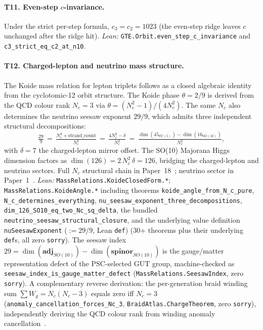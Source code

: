 \documentclass[12pt]{article}
\numberwithin{equation}{section}
\begin{document}
\paragraph{T11. Even-step $c$-invariance.}
Under the strict per-step formula, $c_3 = c_2 = 1023$ (the even-step ridge leaves $c$ unchanged after the ridge hit).
\textit{Lean:} \texttt{GTE.Orbit.even\_step\_c\_invariance} and \texttt{c3\_strict\_eq\_c2\_at\_n10}.

\paragraph{T12. Charged-lepton and neutrino mass structure.}
The Koide mass relation for lepton triplets follows as a closed algebraic identity from the cyclotomic-12 orbit structure.  The Koide phase $\theta = 2/9$ is derived from the QCD colour rank $N_c = 3$ via $\theta = (N_c^2-1)/(4N_c^2)$.  The same $N_c$ also determines the neutrino seesaw exponent $29/9$, which admits three independent structural decompositions:
\[
\tfrac{29}{9} \,=\, \tfrac{N_c^3 + \mathrm{strand\_count}}{N_c^2} \,=\, \tfrac{4N_c^2 - \delta}{N_c^2} \,=\, \tfrac{\dim(45_{\mathrm{SU}(5)}) - \dim(16_{\mathrm{SO}(10)})}{N_c^2},
\]
with $\delta = 7$ the charged-lepton mirror offset.  The SO(10) Majorana Higgs dimension factors as $\dim(126) = 2\,N_c^2\,\delta = 126$, bridging the charged-lepton and neutrino sectors.  Full $N_c$ structural chain in Paper~18~\cite{Spivack2026_Koide}; neutrino sector in Paper~1~\cite{Spivack2025_ParticlePhysics}.
\textit{Lean:} \texttt{MassRelations.KoideClosedForm.*}; \texttt{MassRelations.KoideAngle.*} including theorems \texttt{koide\_angle\_from\_N\_c\_pure}, \texttt{N\_c\_determines\_everything}, \texttt{nu\_seesaw\_exponent\_three\_decompositions}, \texttt{dim\_126\_SO10\_eq\_two\_Nc\_sq\_delta}, the bundled \texttt{neutrino\_seesaw\_structural\_closure}, and the underlying value definition \texttt{nuSeesawExponent} ($:= 29/9$, Lean \texttt{def}) (30+ theorems plus their underlying \texttt{def}s, all zero \texttt{sorry}).  The seesaw index $29 = \dim(\mathbf{adj}_{SO(10)}) - \dim(\mathbf{spinor}_{SO(10)})$ is the gauge/matter representation defect of the PSC-selected GUT group, machine-checked as \texttt{seesaw\_index\_is\_gauge\_matter\_defect} (\texttt{MassRelations.SeesawIndex}, zero \texttt{sorry}).  A complementary reverse derivation: the per-generation braid winding sum $\sum W_g = N_c(N_c-3)$ equals zero iff $N_c=3$ (\texttt{anomaly\_cancellation\_forces\_Nc\_3}, \texttt{BraidAtlas.ChargeTheorem}, zero \texttt{sorry}), independently deriving the QCD colour rank from winding anomaly cancellation~\cite{SpivackBraidAtlas}.
\end{document}
